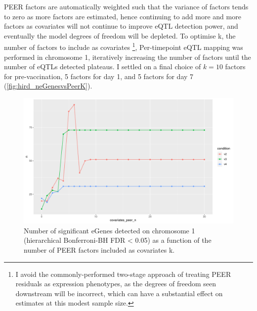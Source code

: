 PEER factors are automatically weighted such that the variance of factors tends to zero as more factors are estimated, 
hence continuing to add more and more factors as covariates will not continue to improve \gls{eQTL} detection power, and eventually the model degrees of freedom will be depleted.
To optimise k, the number of factors to include as covariates%
\footnote{I avoid the commonly-performed two-stage approach of treating PEER residuals as expression phenotypes, as the degrees of freedom seen downstream will be incorrect, which can have a substantial effect on estimates at this modest sample size.}, 
Per-timepoint \gls{eQTL} mapping was performed in chromosome 1, iteratively increasing the number of factors until the number of \glspl{eQTL} detected plateaus.
I settled on a final choice of $k=10$ factors for pre-vaccination, 5 factors for day 1, and 5 factors for day 7 (\autoref{fig:hird_neGenesvsPeerK}).

\begin{figure}
    \centering
    \includegraphics[width=1.0\textwidth,page=1]{mainmatter/figures/chapter_03/count_eGenes.signif_eGenes_vs_PEER_n.dataset_mega.chr_chr1.pdf}
    \caption{Number of significant eGenes detected on chromosome 1 (hierarchical Bonferroni-\gls{BH}\autocite{huang2018PowerFalseDiscovery} FDR < 0.05) as a function of the number of PEER factors included as covariates k.}
    \label{fig:hird_neGenesvsPeerK}
\end{figure}

